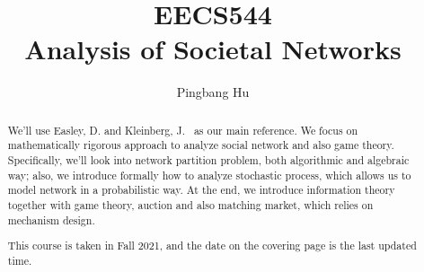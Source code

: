 \documentclass[a4paper]{report}
\author{Pingbang Hu}
\title{EECS544\\Analysis of Societal Networks}
\begin{document}
\maketitle

\begin{abstract}
	We'll use Easley, D. and Kleinberg, J.~\cite{easley2010networks} as our main reference. We focus on mathematically rigorous approach to analyze social network and also game theory. Specifically, we'll look into network partition problem, both algorithmic and algebraic way; also, we introduce formally how to analyze stochastic process, which allows us to model network in a probabilistic way. At the end, we introduce information theory together with game theory, auction and also matching market, which relies on mechanism design.

	This course is taken in Fall 2021, and the date on the covering page is the last updated time.
\end{abstract}

\tableofcontents

\newpage


\newpage
\appendix
\appendixpage



\newpage
\printbibliography
\end{document}

